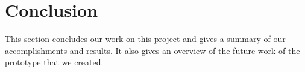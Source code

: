 \section{Conclusion}\label{Conclusion}
    This section concludes our work on this project and gives a summary of our accomplishments and results. It also gives an overview of the future work of the prototype that we created.
    
    

    
    
    

